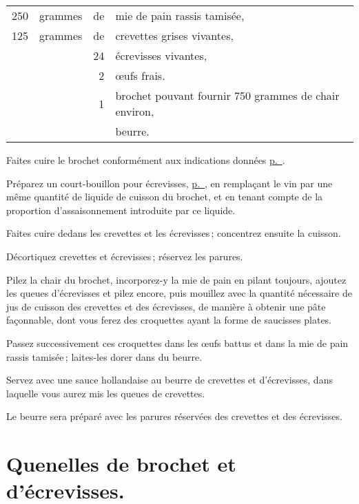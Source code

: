 \footnotesize
\begin{longtable}{rrrp{16em}}
    250 & grammes & de & mie de pain rassis tamisée,                                                      \\
    125 & grammes & de & crevettes grises vivantes,                                                       \\
        &         & 24 & écrevisses vivantes,                                                             \\
        &         &  2 & œufs frais.                                                                      \\
        &         &  1 & brochet pouvant fournir 750 grammes de chair environ,                            \\
        &         &    & beurre.                                                                          \\
\end{longtable}
\normalsize

Faites cuire le brochet conformément aux indications données
\hyperlink{p0323}{p. \pageref{pg0323}}.

Préparez un court-bouillon pour écrevisses,
\hyperlink{p0287}{p. \pageref{pg0287}}, en remplaçant le vin par une même quantité
de liquide de cuisson du brochet, et en tenant compte de la proportion
d'assaisonnement introduite par ce liquide.

Faites cuire dedans les crevettes et les écrevisses ; concentrez ensuite la
cuisson.

Décortiquez crevettes et écrevisses ; réservez les parures.

Pilez la chair du brochet, incorporez-y la mie de pain en pilant toujours,
ajoutez les queues d'écrevisses et pilez encore, puis mouillez avec la quantité
nécessaire de jus de cuisson des crevettes et des écrevisses, de manière
à obtenir une pâte façonnable, dont vous ferez des croquettes ayant la forme de
saucisses plates.

Passez successivement ces croquettes dans les œufs battus et dans la mie de
pain rassis tamisée ; laites-les dorer dans du beurre.

Servez avec une sauce hollandaise au beurre de crevettes et d'écrevisses, dans
laquelle vous aurez mis les queues de crevettes.

Le beurre sera préparé avec les parures réservées des crevettes et des écrevisses.

\section*{\centering Quenelles de brochet et d’écrevisses.}
\label{pg0328} \hypertarget{p0328}{}

